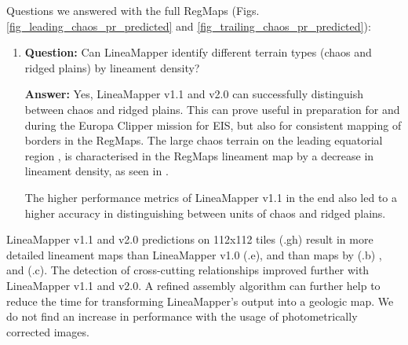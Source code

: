 Questions we answered with the full RegMaps (Figs. \ref{fig_leading_chaos_pr_predicted} and \ref{fig_trailing_chaos_pr_predicted}):
\begin{enumerate}
    \item \textbf{Question:} Can LineaMapper identify different terrain types (chaos and ridged plains) by lineament density?
    
    \textbf{Answer:} Yes, LineaMapper v1.1 and v2.0 can successfully distinguish between chaos and ridged plains. This can prove useful in preparation for and during the Europa Clipper mission for EIS, but also for consistent mapping of borders in the RegMaps. The large chaos terrain on the leading equatorial region , is characterised in the RegMaps lineament map by a decrease in lineament density, as seen in .
    
    The higher performance metrics of LineaMapper v1.1 in the end also led to a higher accuracy in distinguishing between units of chaos and ridged plains.

\end{enumerate}

LineaMapper v1.1 and v2.0 predictions on 112x112 tiles  (.gh) result in more detailed lineament maps than LineaMapper v1.0 (.e), and than maps by  (.b) , and  (.c). The detection of cross-cutting relationships improved further with LineaMapper v1.1 and v2.0. A refined assembly algorithm can further help to reduce the time for transforming LineaMapper's output into a geologic map. We do not find an increase in performance with the usage of photometrically corrected images.

